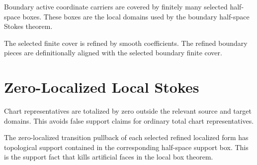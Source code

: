 \begin{definition}
  \label{def:selected_boundary_finite_cover}
  \leanok
  Boundary active coordinate carriers are covered by finitely many selected
  half-space boxes.  These boxes are the local domains used by the boundary
  half-space Stokes theorem.
\end{definition}

\begin{definition}
  \label{def:selected_smooth_refinement}
  \leanok
  The selected finite cover is refined by smooth coefficients.  The refined
  boundary pieces are definitionally aligned with the selected boundary finite
  cover.
\end{definition}

\section{Zero-Localized Local Stokes}
\label{sec:zero_localized_route}

\begin{definition}
  \label{def:zero_localized_representative}
  \leanok
  Chart representatives are totalized by zero outside the relevant source and
  target domains.  This avoids false support claims for ordinary total chart
  representatives.
\end{definition}

\begin{theorem}
  \label{thm:zero_support_selected_refinement}
  \leanok
  The zero-localized transition pullback of each selected refined localized
  form has topological support contained in the corresponding half-space support
  box.  This is the support fact that kills artificial faces in the local box
  theorem.
\end{theorem}

